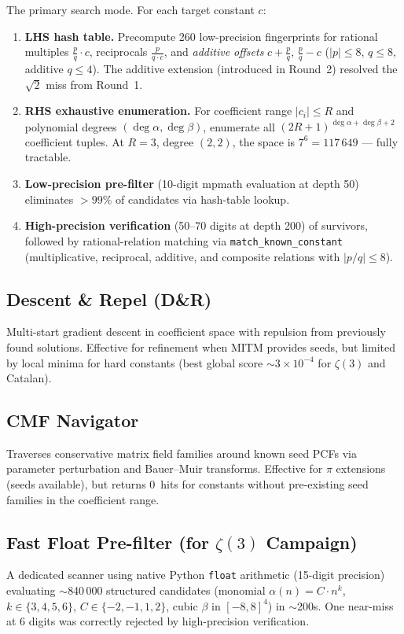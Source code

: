 \documentclass[11pt,a4paper]{article}
\begin{document}
The primary search mode.  For each target constant $c$:
\begin{enumerate}[leftmargin=2em]
\item \textbf{LHS hash table.}  Precompute 260 low-precision fingerprints
      for rational multiples $\tfrac{p}{q}\cdot c$, reciprocals
      $\tfrac{p}{q\cdot c}$, and \emph{additive offsets}
      $c + \tfrac{p}{q}$, $\tfrac{p}{q} - c$
      ($|p|\le 8$, $q\le 8$, additive $q\le 4$).
      The additive extension (introduced in Round~2) resolved the
      $\sqrt{2}$ miss from Round~1.
\item \textbf{RHS exhaustive enumeration.}  For coefficient range
      $\lvert c_i\rvert \le R$ and polynomial degrees
      $(\deg\alpha, \deg\beta)$, enumerate all $(2R+1)^{\deg\alpha+\deg\beta+2}$
      coefficient tuples.  At $R=3$, degree $(2,2)$, the space is
      $7^6 = 117\,649$ --- fully tractable.
\item \textbf{Low-precision pre-filter}  (10-digit mpmath evaluation at
      depth 50) eliminates $>99\%$ of candidates via hash-table lookup.
\item \textbf{High-precision verification} (50--70 digits at depth 200)
      of survivors, followed by rational-relation matching via
      \texttt{match\_known\_constant} (multiplicative, reciprocal,
      additive, and composite relations with $|p/q| \le 8$).
\end{enumerate}

\subsection{Descent \& Repel (D\&R)}
Multi-start gradient descent in coefficient space with repulsion from
previously found solutions.  Effective for refinement when MITM provides
seeds, but limited by local minima for hard constants (best global score
$\sim 3\times10^{-4}$ for $\zeta(3)$ and Catalan).

\subsection{CMF Navigator}
Traverses conservative matrix field families around known seed PCFs via
parameter perturbation and Bauer--Muir transforms.  Effective for
$\pi$ extensions (seeds available), but returns 0~hits for constants
without pre-existing seed families in the coefficient range.

\subsection{Fast Float Pre-filter (for $\zeta(3)$ Campaign)}
A dedicated scanner using native Python \texttt{float} arithmetic
(15-digit precision) evaluating $\sim$840\,000 structured candidates
(monomial $\alpha(n) = C\cdot n^k$, $k \in \{3,4,5,6\}$,
$C \in \{-2,-1,1,2\}$, cubic $\beta$ in $[-8,8]^4$) in $\sim$200s.
One near-miss at 6 digits was correctly rejected by high-precision
verification.
\end{document}
